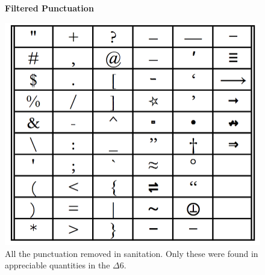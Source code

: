 \newpage
\addtocounter{page}{-2}
\begin{figure}[H]
    \centering
    \textbf{Filtered Punctuation }\par\medskip
    \includegraphics[scale=0.2]{Algorithm/punct_table.png}
    \caption[Punctuation removed in sanitation processing]{All the punctuation removed in sanitation. Only these were found in appreciable quantities in the $\Delta6$. }
     \label{fig:punct}
\end{figure}

